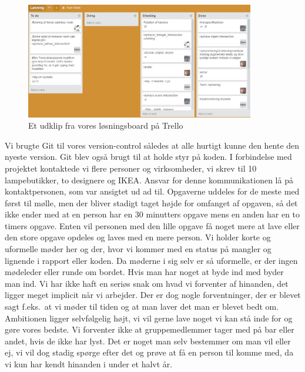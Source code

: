 \documentclass[oneside,a4paper,titlepage]{article}
\begin{document}
\begin{figure}[H]
    \centering
    \includegraphics[width=10cm]{graphics/trello}
    \caption{Et udklip fra vores løsningsboard på Trello}
    \label{fig:trello}
\end{figure} 
Vi brugte Git til vores version-control således at alle hurtigt kunne den hente den nyeste version. Git blev også brugt til at holde styr på koden. I forbindelse med projektet kontaktede vi flere personer og virksomheder, vi skrev til 10 lampebutikker, to designere og IKEA. Ansvar for denne kommunikationen lå på kontaktpersonen, som var ansigtet ud ad til. \newline\newline
Opgaverne uddeles for de meste med først til mølle, men der bliver stadigt taget højde for omfanget af opgaven, så det ikke ender med at en person har en 30 minutters opgave mens en anden har en to timers opgave. Enten vil personen med den lille opgave få noget mere at lave eller den store opgave opdeles og laves med en mere person. Vi holder korte og uformelle møder her og der, hvor vi kommer med en status på mangler og lignende i rapport eller koden. Da møderne i sig selv er så uformelle, er der ingen mødeleder eller runde om bordet. Hvis man har noget at byde ind med byder man ind. \newline\newline
Vi har ikke haft en seriøs snak om hvad vi forventer af hinanden, det ligger meget implicit når vi arbejder. Der er dog nogle forventninger, der er blevet sagt f.eks.\ at vi møder til tiden og at man laver det man er blevet bedt om. Ambitionen ligger selvfølgelig højt, vi vil gerne lave noget vi kan stå inde for og gøre vores bedste. Vi forventer ikke at gruppemedlemmer tager med på bar eller andet, hvis de ikke har lyst. Det er noget man selv bestemmer om man vil eller ej, vi vil dog stadig spørge efter det og prøve at få en person til komme med, da vi kun har kendt hinanden i under et halvt år. \newline\newline
\end{document}
